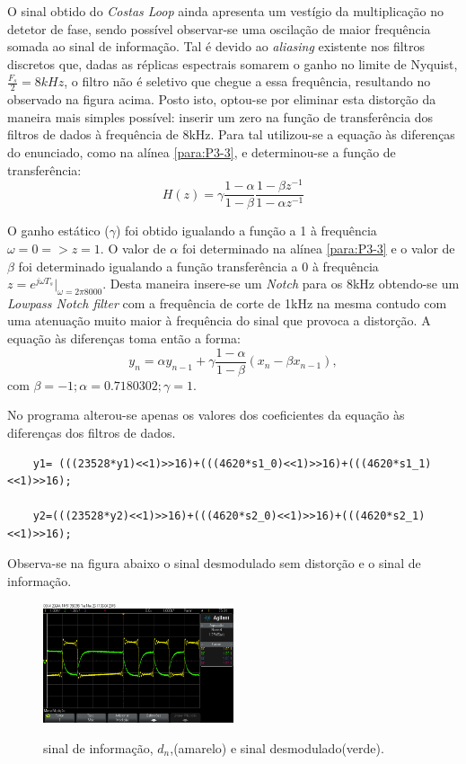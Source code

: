 \documentclass[11pt]{article}
\numberwithin{equation}{section}
\begin{document}
	O sinal obtido do \textit{Costas Loop} ainda apresenta um vestígio da multiplicação no detetor de fase, sendo possível observar-se uma oscilação de maior frequência somada ao sinal de informação. Tal é devido ao \textit{aliasing} existente nos filtros discretos que, dadas as réplicas espectrais somarem o ganho no limite de Nyquist, $\frac{F_s}{2} = 8kHz$, o filtro  não é seletivo que chegue a essa frequência, resultando no observado na figura acima. Posto isto, optou-se por eliminar esta distorção da maneira mais simples possível: inserir um zero na função de transferência dos filtros de dados à frequência de 8kHz. Para tal utilizou-se a equação às diferenças do enunciado, como na alínea \ref{para:P3-3}, e determinou-se a função de transferência:
	\begin{equation}
	H(z) = \gamma\frac{1-\alpha}{1-\beta}\dfrac{1-\beta z^{-1}}{1-\alpha z^{-1}}
	\end{equation}
	
	O ganho estático ($\gamma$) foi obtido igualando a função a 1 à frequência $\omega=0 => z=1$. O valor de $\alpha$ foi determinado na alínea \ref{para:P3-3} e o valor de $\beta$ foi determinado igualando a função transferência a 0 à frequência $z=e^{j\omega T_s}|_{\omega=2\pi8000}$. Desta maneira insere-se um \textit{Notch} para os 8kHz obtendo-se um \textit{Lowpass Notch filter} com a frequência de corte de 1kHz na mesma contudo com uma atenuação muito maior à frequência do sinal que provoca a distorção.
	A equação às diferenças toma então a forma:
	\begin{equation}
	y_n = \alpha y_{n-1}+\gamma\frac{1-\alpha}{1-\beta}(x_n-\beta x_{n-1}), 
	\end{equation}
	com $\beta=-1; \alpha=0.7180302; \gamma=1.$
	
	No programa alterou-se apenas os valores dos coeficientes da equação às diferenças dos filtros de dados.
	
	\begin{lstlisting}
	y1= (((23528*y1)<<1)>>16)+(((4620*s1_0)<<1)>>16)+(((4620*s1_1)<<1)>>16);
	
	y2=(((23528*y2)<<1)>>16)+(((4620*s2_0)<<1)>>16)+(((4620*s2_1)<<1)>>16);
	\end{lstlisting}
	
	Observa-se na figura abaixo o sinal desmodulado sem distorção e o sinal de informação.
	\begin{figure}[H]
		\centering
		\includegraphics[width=0.5\textwidth]{./dn_y1}~\\
		\caption{sinal de informação, $d_n$,(amarelo) e sinal desmodulado(verde).}
		\label{demod}
	\end{figure}
	
\end{document}
